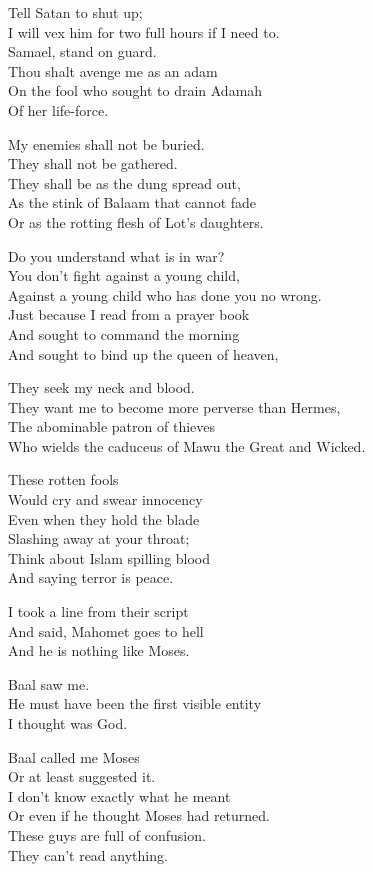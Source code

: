 \documentclass[
]{book}
\begin{document}
Tell Satan to shut up;\\
I will vex him for two full hours if I need to.\\
Samael, stand on guard.\\
Thou shalt avenge me as an adam\\
On the fool who sought to drain Adamah\\
Of her life-force.

My enemies shall not be buried.\\
They shall not be gathered.\\
They shall be as the dung spread out,\\
As the stink of Balaam that cannot fade\\
Or as the rotting flesh of Lot's daughters.

Do you understand what is in war?\\
You don't fight against a young child,\\
Against a young child who has done you no wrong.\\
Just because I read from a prayer book\\
And sought to command the morning\\
And sought to bind up the queen of heaven,

They seek my neck and blood.\\
They want me to become more perverse than Hermes,\\
The abominable patron of thieves\\
Who wields the caduceus of Mawu the Great and Wicked.

These rotten fools\\
Would cry and swear innocency\\
Even when they hold the blade\\
Slashing away at your throat;\\
Think about Islam spilling blood\\
And saying terror is peace.

I took a line from their script\\
And said, Mahomet goes to hell\\
And he is nothing like Moses.

Baal saw me.\\
He must have been the first visible entity\\
I thought was God.

Baal called me Moses\\
Or at least suggested it.\\
I don't know exactly what he meant\\
Or even if he thought Moses had returned.\\
These guys are full of confusion.\\
They can't read anything.
\end{document}
